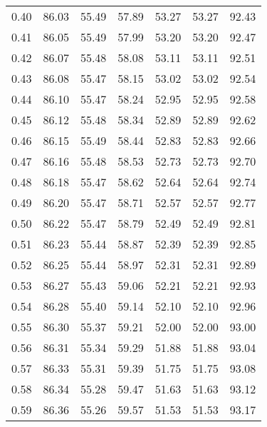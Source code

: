 \begin{tabular}{|c|c|c|c|c|c|c|}
      0.40 &     86.03 &     55.49 &      57.89 &   53.27 &      53.27 &         92.43 \\
      0.41 &     86.05 &     55.49 &      57.99 &   53.20 &      53.20 &         92.47 \\
      0.42 &     86.07 &     55.48 &      58.08 &   53.11 &      53.11 &         92.51 \\
      0.43 &     86.08 &     55.47 &      58.15 &   53.02 &      53.02 &         92.54 \\
      0.44 &     86.10 &     55.47 &      58.24 &   52.95 &      52.95 &         92.58 \\
      0.45 &     86.12 &     55.48 &      58.34 &   52.89 &      52.89 &         92.62 \\
      0.46 &     86.15 &     55.49 &      58.44 &   52.83 &      52.83 &         92.66 \\
      0.47 &     86.16 &     55.48 &      58.53 &   52.73 &      52.73 &         92.70 \\
      0.48 &     86.18 &     55.47 &      58.62 &   52.64 &      52.64 &         92.74 \\
      0.49 &     86.20 &     55.47 &      58.71 &   52.57 &      52.57 &         92.77 \\
      0.50 &     86.22 &     55.47 &      58.79 &   52.49 &      52.49 &         92.81 \\
      0.51 &     86.23 &     55.44 &      58.87 &   52.39 &      52.39 &         92.85 \\
      0.52 &     86.25 &     55.44 &      58.97 &   52.31 &      52.31 &         92.89 \\
      0.53 &     86.27 &     55.43 &      59.06 &   52.21 &      52.21 &         92.93 \\
      0.54 &     86.28 &     55.40 &      59.14 &   52.10 &      52.10 &         92.96 \\
      0.55 &     86.30 &     55.37 &      59.21 &   52.00 &      52.00 &         93.00 \\
      0.56 &     86.31 &     55.34 &      59.29 &   51.88 &      51.88 &         93.04 \\
      0.57 &     86.33 &     55.31 &      59.39 &   51.75 &      51.75 &         93.08 \\
      0.58 &     86.34 &     55.28 &      59.47 &   51.63 &      51.63 &         93.12 \\
      0.59 &     86.36 &     55.26 &      59.57 &   51.53 &      51.53 &         93.17 \\

\end{tabular}
